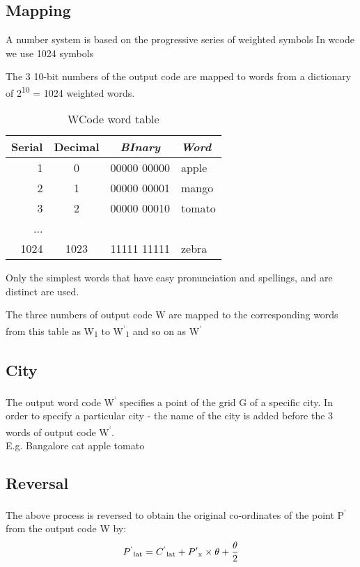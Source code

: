 \documentclass[conference]{IEEEtran}
\begin{document}
\subsection{Mapping}

A number system is based on the progressive series of weighted symbols
In wcode we use 1024 symbols

The 3 10-bit numbers of the output code are mapped to words from a dictionary of 2\textsuperscript{10} = 1024 weighted words.
\begin{table}[h!]
\caption{WCode word table} \begin{center}
\bgroup
\def\arraystretch{1.4}%
\begin{tabular}{r|c|c|l}
\textbf{Serial} & \textbf{Decimal} & \textbf{\textit{BInary}} & \textbf{\textit{Word}} \\
\hline
1 & 0 & 00000 00000 & apple\\
\hline
2 & 1 & 00000 00001 & mango \\
\hline
3 & 2 & 00000 00010 & tomato \\
... & & & \\
1024 & 1023 & 11111 11111 & zebra
\end{tabular}
\egroup
\end{center} \end{table}

Only the simplest words that have easy pronunciation and spellings, and are distinct are used.

The three numbers of output code W are mapped to the corresponding words from this table as W\textsubscript{1} to W\textsuperscript{`}\textsubscript{1} and so on as W\textsuperscript{`}
\subsection{City}
The output word code W\textsuperscript{`} specifies a point of the grid G of a specific city. In order to specify a particular city - the name of the city is added before the 3 words of output code W\textsuperscript{`}.\\

E.g. Bangalore cat apple tomato

\subsection{Reversal}\label{AA}
The above process is reversed to obtain the original co-ordinates of the point P\textsuperscript{`} from the output code W by:
\begin{equation}P\textsuperscript{`}\textsubscript{lat} = C\textsuperscript{`}\textsubscript{lat} +  P'\textsubscript{x} \times {\theta} + \frac{\theta}{2}\end{equation}
\end{document}
